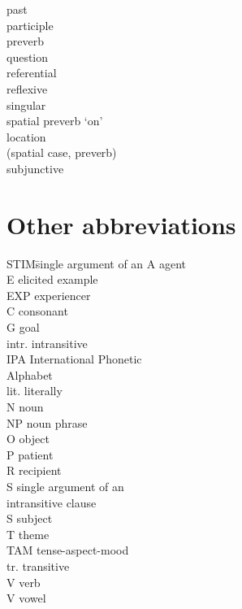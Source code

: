 \begin{multicols}{2}
\begin{tabbing}
				\>	past\\
				\>	participle\\
				\>	preverb\\
					\>	question\\
				\>	referential\\
				\>	reflexive\\
				\>	singular\\
				\>	spatial preverb `on'\\
				\>	location \\
			{}		\>	(spatial case, preverb)\\
				\>	subjunctive
		\end{tabbing}
	\end{multicols}


\section*{Other abbreviations}
	\begin{multicols}{2}
		\begin{tabbing}
		  STIM\hspace{\tabcolsep}\= single argument of an\kill
			A 		\>	agent\\
			E	\>	elicited example\\
			EXP 	\>	experiencer\\
			C		\>  consonant\\
			G 		\>	goal\\
			intr. 	\>	intransitive\\
			IPA 	\>	International Phonetic\\
			{}		\>	Alphabet\\
			lit. 	\>	literally\\
			N 		\>	noun\\
			NP 		\>	noun phrase\\
			O		\>	object\\
			P 		\>	patient\\
			R 		\>	recipient\\
			S 		\>	single argument of an\\
			{}		\>	intransitive clause\\
			S		\>	subject\\
			T 		\>	theme\\
			TAM 	\>	tense-aspect-mood\\
			tr. 	\>	transitive\\
			V 		\>	verb\\
			V		\> 	vowel\\
		\end{tabbing}
	\end{multicols}
